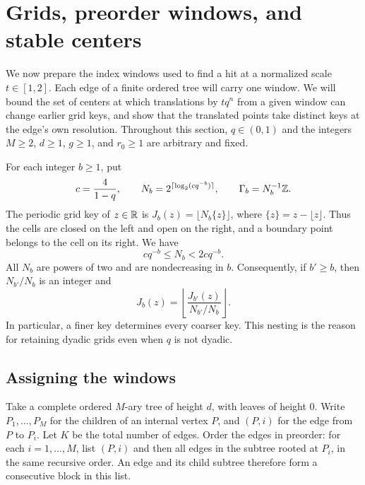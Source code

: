 \section{Grids, preorder windows, and stable centers}\label{sec:windows}

We now prepare the index windows used to find a hit at a normalized scale
$t\in[1,2]$.  Each edge of a finite ordered tree will carry one window.
We will bound the set of centers at which translations by $tq^n$ from a
given window can change earlier grid keys, and show that the translated
points take distinct keys at the edge's own resolution.
Throughout this section, $q\in(0,1)$ and the integers
$M\ge2$, $d\ge1$, $g\ge1$, and $r_0\ge1$ are arbitrary and fixed.

For each integer $b\ge1$, put
\[
 c=\frac{4}{1-q},\qquad
 N_b=2^{\lceil\log_2(cq^{-b})\rceil},\qquad
 \Gamma_b=N_b^{-1}\mathbb Z.
\]
The periodic grid key of $z\in\mathbb R$ is
$J_b(z)=\lfloor N_b\{z\}\rfloor$, where
$\{z\}=z-\lfloor z\rfloor$.  Thus the cells are closed on the left and
open on the right, and a boundary point belongs to the cell on its right.
We have
\begin{equation}\label{eq:grid-size}
 cq^{-b}\le N_b<2cq^{-b}.
\end{equation}
All $N_b$ are powers of two and are nondecreasing in $b$.  Consequently,
if $b'\ge b$, then $N_{b'}/N_b$ is an integer and
\[
 J_b(z)=\left\lfloor\frac{J_{b'}(z)}{N_{b'}/N_b}\right\rfloor.
\]
In particular, a finer key determines every coarser key.  This nesting
is the reason for retaining dyadic grids even when $q$ is not dyadic.

\subsection*{Assigning the windows}

Take a complete ordered $M$-ary tree of height $d$, with leaves of height
$0$.  Write $P_1,\ldots,P_M$ for the children of an internal vertex $P$,
and $(P,i)$ for the edge from $P$ to $P_i$.  Let $K$ be the total number
of edges.  Order the edges in preorder: for each $i=1,\ldots,M$, list
$(P,i)$ and then all edges in the subtree rooted at $P_i$, in the same
recursive order.  An edge and its child subtree therefore form a
consecutive block in this list.


